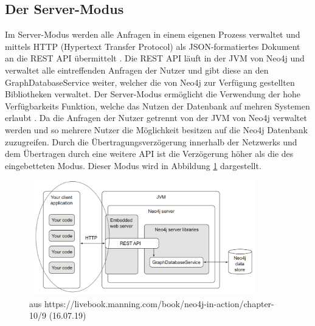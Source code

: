 \subsection{Der Server-Modus} \label{Server}
Im Server-Modus werden alle Anfragen in einem eigenen Prozess verwaltet und mittels HTTP (Hypertext Transfer Protocol) als JSON-formatiertes Dokument an die REST API übermittelt \parencite{robinson2013graph}. Die REST API läuft in der JVM von Neo4j und verwaltet alle eintreffenden Anfragen der Nutzer und gibt diese an den GraphDatabaseService weiter, welcher die von Neo4j zur Verfügung gestellten Bibliotheken verwaltet. \newline 
Der Server-Modus ermöglicht die Verwendung der hohe Verfügbarkeits Funktion, welche das Nutzen der Datenbank auf mehren Systemen erlaubt \parencite{raj2015neo4j}. Da die Anfragen der Nutzer getrennt von der JVM von Neo4j verwaltet werden und so mehrere Nutzer die Möglichkeit besitzen auf die Neo4j Datenbank zuzugreifen. Durch die  Übertragungsverzögerung innerhalb der Netzwerks und dem Übertragen durch eine weitere API ist die Verzögerung höher als die des eingebetteten Modus. Dieser Modus wird in Abbildung \ref{fig:Server} dargestellt.
\begin{figure}[!htb]
	\centering
	\includegraphics [width=10cm, height=5cm]{Figures/server}
	\caption[Server Modus]{aus https://livebook.manning.com/book/neo4j-in-action/chapter-10/9 (16.07.19)}
	\label{fig:Server}
\end{figure}


